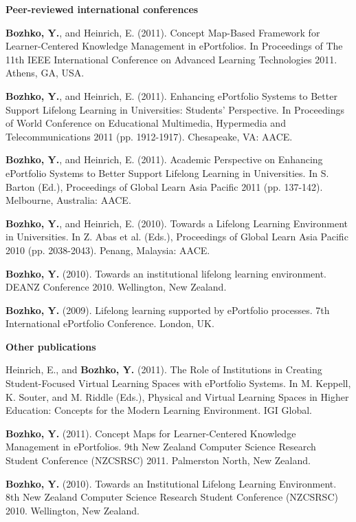 \LARGE \textbf{Peer-reviewed international conferences}

\normalsize
\textbf{Bozhko, Y.}, and Heinrich, E. (2011). Concept Map-Based Framework for
Learner-Centered Knowledge Management in ePortfolios. In Proceedings of
The 11th IEEE International Conference on Advanced Learning Technologies 2011.
Athens, GA, USA.

\textbf{Bozhko, Y.}, and Heinrich, E. (2011). Enhancing ePortfolio Systems to
Better Support Lifelong Learning in Universities: Students' Perspective. In
Proceedings of World Conference on Educational Multimedia, Hypermedia and
Telecommunications 2011 (pp. 1912-1917). Chesapeake, VA: AACE.

\textbf{Bozhko, Y.}, and Heinrich, E. (2011). Academic Perspective on Enhancing
ePortfolio Systems to Better Support Lifelong Learning in Universities. In S.
Barton (Ed.), Proceedings of Global Learn Asia Pacific 2011 (pp. 137-142).
Melbourne, Australia: AACE.

﻿\textbf{Bozhko, Y.}, and Heinrich, E. (2010). Towards a Lifelong Learning
Environment in Universities. In Z. Abas et al. (Eds.), Proceedings of Global
Learn Asia Pacific 2010 (pp. 2038-2043). Penang, Malaysia: AACE. 

\textbf{Bozhko, Y.} (2010). Towards an institutional lifelong learning
environment. DEANZ Conference 2010. Wellington, New Zealand.

\textbf{Bozhko, Y.} (2009). Lifelong learning supported by ePortfolio processes.
7th International ePortfolio Conference. London, UK.

\LARGE \textbf{Other publications}

\normalsize
﻿Heinrich, E., and \textbf{Bozhko, Y.} (2011). The Role of Institutions in
Creating Student-Focused Virtual Learning Spaces with ePortfolio Systems. In M. Keppell,
K. Souter, and M. Riddle (Eds.), Physical and Virtual Learning Spaces in Higher
Education: Concepts for the Modern Learning Environment. IGI Global.

\textbf{Bozhko, Y.} (2011). Concept Maps for Learner-Centered Knowledge
Management in ePortfolios. 9th New Zealand Computer Science Research Student Conference
(NZCSRSC) 2011. Palmerston North, New Zealand.

\textbf{Bozhko, Y.} (2010). Towards an Institutional Lifelong Learning
Environment. 8th New Zealand Computer Science Research Student Conference (NZCSRSC) 2010.
Wellington, New Zealand.





